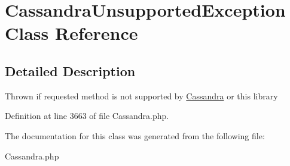 \hypertarget{classCassandraUnsupportedException}{
\section{CassandraUnsupportedException Class Reference}
\label{classCassandraUnsupportedException}
}


\subsection{Detailed Description}
Thrown if requested method is not supported by \hyperlink{classCassandra}{Cassandra} or this library 

Definition at line 3663 of file Cassandra.php.



The documentation for this class was generated from the following file:\begin{DoxyCompactItemize}
\item 
Cassandra.php\end{DoxyCompactItemize}
